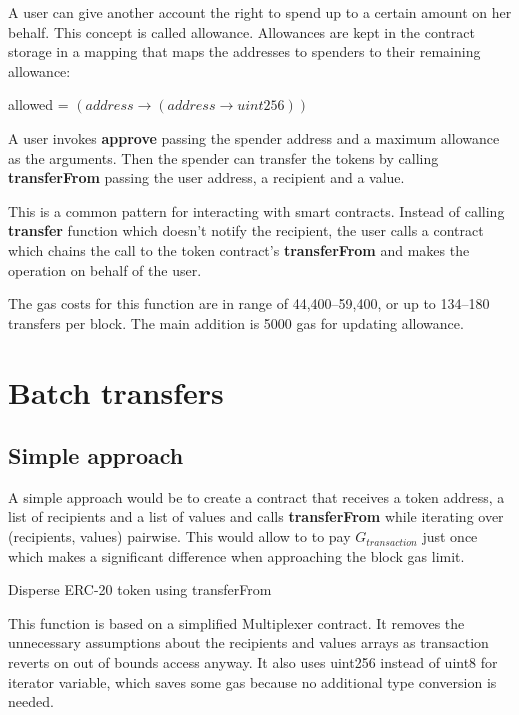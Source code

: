 \documentclass[12pt]{article}
\begin{document}
A user can give another account the right to spend up to a certain amount on her behalf. This concept is called allowance. Allowances are kept in the contract storage in a mapping that maps the addresses to spenders to their remaining allowance:
\begin{center}
	allowed = $(address \rightarrow (address \rightarrow uint256))$
\end{center}

A user invokes \textbf{approve} passing the spender address and a maximum allowance as the arguments.
Then the spender can transfer the tokens by calling \textbf{transferFrom} passing the user address, a recipient and a value.

This is a common pattern for interacting with smart contracts.
Instead of calling \textbf{transfer} function which doesn't notify the recipient, the user calls a contract which chains the call to the token contract's \textbf{transferFrom} and makes the operation on behalf of the user.

The gas costs for this function are in range of 44,400--59,400, or up to 134--180 transfers per block. The main addition is 5000 gas for updating allowance.

\section{Batch transfers}
\subsection{Simple approach}

A simple approach would be to create a contract that receives a token address, a list of recipients and a list of values and calls \textbf{transferFrom} while iterating over (recipients, values) pairwise. This would allow to to pay $G_{transaction}$ just once which makes a significant difference when approaching the block gas limit.

\begin{algorithm}[h]
\label{simple}
\caption{Disperse ERC-20 token using transferFrom}
\BlankLine
\For{$i \in [0 \dots \text{recipients.length})$}{
	require(token.transferFrom(sender, recipients[i], values[i]))
}
\end{algorithm}
%
This function is based on a simplified Multiplexer contract\cite{multiplexer}.
It removes the unnecessary assumptions about the recipients and values arrays as transaction reverts on out of bounds access anyway\cite{solidity-errors}.
It also uses uint256 instead of uint8 for iterator variable, which saves some gas because no additional type conversion is needed.
\end{document}
